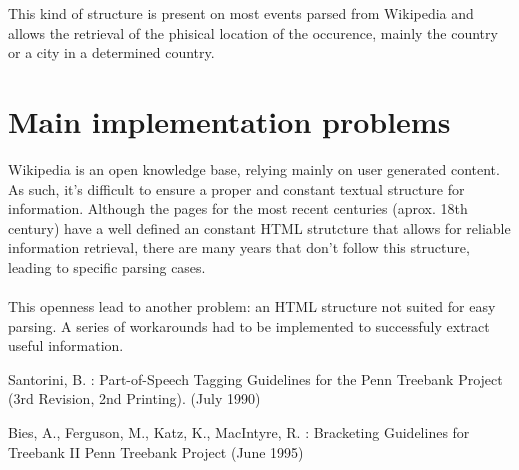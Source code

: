 \documentclass{llncs}
\begin{document}
This kind of structure is present on most events parsed from Wikipedia and allows the retrieval of the phisical location of the occurence, mainly the country or a city in a determined country.

%
\section{Main implementation problems}

Wikipedia is an open knowledge base, relying mainly on user generated content. As such, it's difficult to ensure a proper and constant textual structure for information. Although the pages for the most recent centuries (aprox. 18th century) have a well defined an constant HTML strutcture that allows for reliable information retrieval, there are many years that don't follow this structure, leading to specific parsing cases.\\
\ \\
This openness lead to another problem: an HTML structure not suited for easy parsing. A series of workarounds had to be implemented to successfuly extract useful information.

%
%
\begin{thebibliography}{}
%
Santorini, B. :
Part-of-Speech Tagging Guidelines for the
Penn Treebank Project (3rd Revision, 2nd Printing).
(July 1990)

Bies, A., Ferguson, M., Katz, K., MacIntyre, R. :
Bracketing Guidelines for Treebank II
Penn Treebank Project
(June 1995)

\end{thebibliography}
\clearpage
{} %
\renewcommand{\indexname}{Author Index}
\printindex
\clearpage
{} %
\renewcommand{\indexname}{Subject Index}

\end{document}
